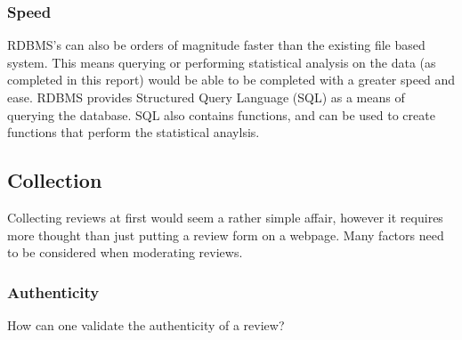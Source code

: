 \documentclass[a4paper]{article}
\begin{document}
\subsubsection{Speed}
RDBMS's can also be orders of magnitude faster than the existing file based system.
This means querying or performing statistical analysis on the data (as completed in this report) would be able to be completed with a greater speed and ease.
RDBMS provides Structured Query Language (SQL) as a means of querying the database.
SQL also contains functions, and can be used to create functions that perform the statistical anaylsis.


\subsection{Collection}
Collecting reviews at first would seem a rather simple affair, however it requires more thought than just putting a review form on a webpage.
Many factors need to be considered when moderating reviews.

\subsubsection{Authenticity}
How can one validate the authenticity of a review?
\end{document}
